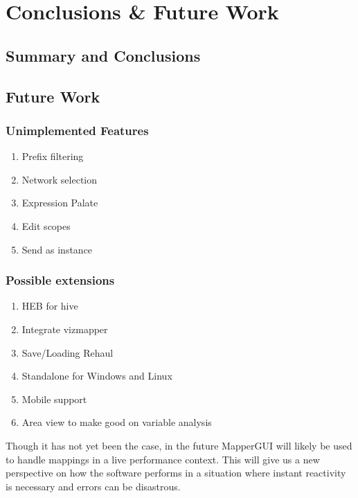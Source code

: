 \chapter{Conclusions \& Future Work}

\section{Summary and Conclusions}

\section{Future Work}
	\subsection{Unimplemented Features}
	\begin{enumerate}
		\item Prefix filtering
		\item Network selection
		\item Expression Palate 
		\item Edit scopes
		\item Send as instance
	\end{enumerate}
	\subsection{Possible extensions} %
	\label{sub:possible_extensions}
	\begin{enumerate}
		\item HEB for hive
		\item Integrate vizmapper
		\item Save/Loading Rehaul
		\item Standalone for Windows and Linux
		\item Mobile support
		\item Area view to make good on variable analysis
	\end{enumerate}

	
Though it has not yet been the case, in the future MapperGUI will likely be used to handle mappings in a live performance context. This will give us a new perspective on how the software performs in a situation where instant reactivity is necessary and errors can be disastrous. 